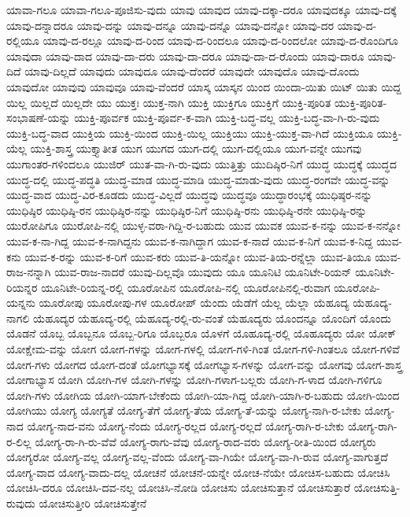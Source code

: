 {ಯಾವಾ-ಗಲೂ
ಯಾವಾ-ಗಲೂ-ಪೂಜಿಸು-ವುದು
ಯಾವು
ಯಾವುದ
ಯಾವು-ದಕ್ಕಾ-ದರೂ
ಯಾವುದಕ್ಕೂ
ಯಾವು-ದಕ್ಕೆ
ಯಾವು-ದನ್ನಾದರೂ
ಯಾವು-ದನ್ನು
ಯಾವು-ದನ್ನೂ
ಯಾವು-ದನ್ನೊ
ಯಾವು-ದನ್ನೋ
ಯಾವು-ದರ
ಯಾವು-ದ-ರಲ್ಲಿಯೂ
ಯಾವು-ದ-ರಲ್ಲೂ
ಯಾವು-ದ-ರಿಂದ
ಯಾವು-ದ-ರಿಂದಲೂ
ಯಾವು-ದ-ರಿಂದಲೋ
ಯಾವು-ದ-ರೊಂದಿಗೂ
ಯಾವುದಾ
ಯಾವು-ದಾದ
ಯಾವು-ದಾ-ದರು
ಯಾವು-ದಾ-ದರೂ
ಯಾವು-ದಾ-ದ-ರೊಂದು
ಯಾವು-ದಾರೂ
ಯಾವು-ದಿದೆ
ಯಾವು-ದಿಲ್ಲದೆ
ಯಾವುದು
ಯಾವುದೂ
ಯಾವು-ದೆಂದರೆ
ಯಾವುದೇ
ಯಾವುದೊ
ಯಾವು-ದೊಂದು
ಯಾವುದೋ
ಯಾವುವು
ಯಾವುವೂ
ಯಾವು-ವೆಂದರೆ
ಯಾಸ್ಕ
ಯಾಸ್ಕನ
ಯಿಂದ
ಯಿಂದಾ-ಯಿತು
ಯಿಟ್
ಯಿತು
ಯಿದ್ದ
ಯಿಲ್ಲ
ಯಿಲ್ಲದೆ
ಯಿಲ್ಲದೇ
ಯು
ಯುಕ್ತಃ
ಯುಕ್ತ-ನಾಗಿ
ಯುಕ್ತಿ
ಯುಕ್ತಿಗೂ
ಯುಕ್ತಿಗೆ
ಯುಕ್ತಿ-ಪೂರಿತ
ಯುಕ್ತಿ-ಪೂರಿತ-ಸಂಭಾಷಣೆ-ಯನ್ನು
ಯುಕ್ತಿ-ಪೂರ್ವಕ
ಯುಕ್ತಿ-ಪೂರ್ವ-ಕ-ವಾಗಿ
ಯುಕ್ತಿ-ಬದ್ಧ-ವಲ್ಲ
ಯುಕ್ತಿ-ಬದ್ಧ-ವಾ-ಗಿ-ರು-ವುದು
ಯುಕ್ತಿ-ಬದ್ಧ-ವಾದ
ಯುಕ್ತಿಯ
ಯುಕ್ತಿ-ಯಿಂದ
ಯುಕ್ತಿ-ಯಿಲ್ಲ
ಯುಕ್ತಿಯು
ಯುಕ್ತಿ-ಯುಕ್ತ-ವಾ-ಗಿದೆ
ಯುಕ್ತಿಯೂ
ಯುಕ್ತಿ-ಯೆಲ್ಲ
ಯುಕ್ತಿ-ಶಾಸ್ತ್ರ
ಯುಕ್ತ್ಯಾತೀತ
ಯುಗ
ಯುಗದ
ಯುಗ-ದಲ್ಲಿ
ಯುಗ-ದಲ್ಲಿಯೂ
ಯುಗ-ವನ್ನೇ
ಯುಗವು
ಯುಗಾಂತರ-ಗಳಿಂದಲೂ
ಯುಜಿರ್
ಯುತ-ವಾ-ಗಿ-ರು-ವುದು
ಯುತ್ತಿತ್ತು
ಯುದಿಷ್ಠಿರ-ನಿಗೆ
ಯುದ್ಧ
ಯುದ್ಧಕ್ಕೆ
ಯುದ್ಧದ
ಯುದ್ಧ-ದಲ್ಲಿ
ಯುದ್ಧ-ಪದ್ಧತಿ
ಯುದ್ಧ-ಮಾಡ
ಯುದ್ಧ-ಮಾಡಿ
ಯುದ್ಧ-ಮಾಡು-ವುದು
ಯುದ್ಧ-ರಂಗವೇ
ಯುದ್ಧ-ವನ್ನು
ಯುದ್ಧ-ವಾದ
ಯುದ್ಧ-ವಿರ-ಕೂಡದು
ಯುದ್ಧ-ವಿಲ್ಲದೆ
ಯುದ್ಧವು
ಯುದ್ಧವೂ
ಯುದ್ಧಾರಂಭಕ್ಕೆ
ಯುಧಿಷ್ಠರ-ನನ್ನು
ಯುಧಿಷ್ಠಿರ
ಯುಧಿಷ್ಠಿ-ರನ
ಯುಧಿಷ್ಠಿರ-ನನ್ನು
ಯುಧಿಷ್ಠಿರ-ನಿಗೆ
ಯುಧಿಷ್ಠಿ-ರನು
ಯುಧಿಷ್ಠಿ-ರನೇ
ಯುಧಿಷ್ಠಿ-ರನ್ನು
ಯುರೋಪಿಗೂ
ಯುರೋಪಿ-ನಲ್ಲಿ
ಯುಳ್ಳ-ವರಾ-ಗಿದ್ದಿ-ರ-ಬಹುದು
ಯುವ
ಯುವಕ
ಯುವ-ಕ-ನನ್ನು
ಯುವ-ಕ-ನನ್ನೋ
ಯುವ-ಕ-ನಾ-ಗಿದ್ದ
ಯುವ-ಕ-ನಾಗಿದ್ದನು
ಯುವ-ಕ-ನಾಗಿದ್ದಾಗ
ಯುವ-ಕ-ನಾದೆ
ಯುವ-ಕ-ನಿಗೆ
ಯುವ-ಕ-ನಿದ್ದ
ಯುವ-ಕನು
ಯುವ-ಕ-ರನ್ನು
ಯುವ-ಕ-ರಿಗೆ
ಯುವ-ಕರು
ಯುವ-ತಿ-ಯನ್ನೋ
ಯುವ-ತಿಯ-ರನ್ನೆಲ್ಲಾ
ಯುವ-ತಿಯೂ
ಯುವ-ರಾಜ-ನನ್ನಾಗಿ
ಯುವ-ರಾಜ-ನಾದರೆ
ಯುವು-ದಿಲ್ಲವೊ
ಯುವುದು
ಯೂ
ಯೂನಿಟಿ
ಯೂನಿಟೇ-ರಿಯನ್
ಯೂನಿಟೇ-ರಿಯನ್ನರ
ಯೂನಿಟೇ-ರಿಯನ್ನ-ರಲ್ಲಿ
ಯೂರೋಪಿನ
ಯೂರೋಪಿ-ನಲ್ಲಿ
ಯೂರೋಪಿನಲ್ಲಿ-ರುವಾಗ
ಯೂರೋಪಿ-ಯನ್ನನು
ಯೂರೋಪು
ಯೂರೋಪು-ಗಳ
ಯೂರೋಪ್
ಯೆಂದು
ಯೆಡೆಗೆ
ಯೆಲ್ಲ
ಯೆಲ್ಲಾ
ಯೆಹೂದ್ಯ
ಯೆಹೂದ್ಯ-ನಾಗಲಿ
ಯೆಹೂದ್ಯರ
ಯೆಹೂದ್ಯ-ರಲ್ಲಿ
ಯೆಹೂದ್ಯ-ರಲ್ಲಿ-ರು-ವಂತೆ
ಯೆಹೂದ್ಯರು
ಯೊಂದನ್ನೂ
ಯೊಂದಿಗೆ
ಯೊಂದು
ಯೊಡನೆ
ಯೊಬ್ಬ
ಯೊಬ್ಬನೂ
ಯೊಬ್ಬ-ರಿಗೂ
ಯೊಬ್ಬರೂ
ಯೊಳಗೆ
ಯೊಹೂದ್ಯ-ರಲ್ಲಿ
ಯೊಹೂದ್ಯರು
ಯೋ
ಯೋಕ್
ಯೋಕ್ಷೇಮ-ವನ್ನು
ಯೋಗ
ಯೋಗ-ಗಳನ್ನು
ಯೋಗ-ಗಳಲ್ಲಿ
ಯೋಗ-ಗಳಿ-ಗಿಂತ
ಯೋಗ-ಗಳಿ-ಗಿಂತಲೂ
ಯೋಗ-ಗಳಿವೆ
ಯೋಗ-ಗಳು
ಯೋಗದ
ಯೋಗ-ದಂತೆ
ಯೋಗಭ್ಯಾಸಕ್ಕೆ
ಯೋಗಭ್ಯಾಸ-ಗಳನ್ನು
ಯೋಗ-ವನ್ನು
ಯೋಗವು
ಯೋಗ-ಶಾಸ್ತ್ರ
ಯೋಗಾಭ್ಯಾಸ
ಯೋಗಿ
ಯೋಗಿ-ಗಳ
ಯೋಗಿ-ಗಳನ್ನು
ಯೋಗಿ-ಗಳಾಗ-ಬಲ್ಲರು
ಯೋಗಿ-ಗ-ಳಾದ
ಯೋಗಿ-ಗಳಿಗೂ
ಯೋಗಿ-ಗಳು
ಯೋಗಿಯ
ಯೋಗಿ-ಯಾಗ-ಬೇಕೆಂದು
ಯೋಗಿ-ಯಾ-ಗಿದ್ದ
ಯೋಗಿ-ಯಾಗಿ-ರ-ಬಹುದು
ಯೋಗಿ-ಯಿಂದ
ಯೋಗಿಯು
ಯೋಗ್ಯ
ಯೋಗ್ಯತೆ
ಯೋಗ್ಯ-ತೆಗೆ
ಯೋಗ್ಯ-ತೆಯ
ಯೋಗ್ಯ-ತೆ-ಯನ್ನು
ಯೋಗ್ಯ-ನಾಗಿ-ರ-ಬೇಕು
ಯೋಗ್ಯ-ನಾದ
ಯೋಗ್ಯ-ನಾದ-ವನು
ಯೋಗ್ಯ-ನೆಂದು
ಯೋಗ್ಯ-ರಲ್ಲದ
ಯೋಗ್ಯ-ರಲ್ಲದೆ
ಯೋಗ್ಯ-ರಾಗಿ-ರ-ಬೇಕು
ಯೋಗ್ಯ-ರಾಗಿ-ರ-ಲಿಲ್ಲ
ಯೋಗ್ಯ-ರಾ-ಗಿ-ರು-ವೆವೆ
ಯೋಗ್ಯ-ರಾಗು-ವೆವು
ಯೋಗ್ಯ-ರಾದ-ವರು
ಯೋಗ್ಯ-ರೀತಿ-ಯಿಂದ
ಯೋಗ್ಯರು
ಯೋಗ್ಯರೋ
ಯೋಗ್ಯ-ವಲ್ಲ
ಯೋಗ್ಯ-ವಲ್ಲ-ವೆಂದು
ಯೋಗ್ಯ-ವಾ-ಗಿಯೇ
ಯೋಗ್ಯ-ವಾ-ಗಿ-ರುವ
ಯೋಗ್ಯ-ವಾಗುತ್ತದೆ
ಯೋಗ್ಯ-ವಾದ
ಯೋಗ್ಯ-ವಾದು-ದಲ್ಲ
ಯೋಚನೆ
ಯೋಚನೆ-ಯನ್ನೇ
ಯೋಚ-ನೆಯೇ
ಯೋಚಿಸ-ಬಹುದು
ಯೋಚಿಸಿ
ಯೋಚಿಸಿ-ದರೂ
ಯೋಚಿಸಿ-ದವ-ನಲ್ಲ
ಯೋಚಿಸಿ-ನೋಡಿ
ಯೋಚಿಸು
ಯೋಚಿಸುತ್ತಾನೆ
ಯೋಚಿಸುತ್ತಾರೆ
ಯೋಚಿಸುತ್ತಿ-ರುವುದು
ಯೋಚಿಸುತ್ತೀರಿ
ಯೋಚಿಸುತ್ತೇನೆ
}
